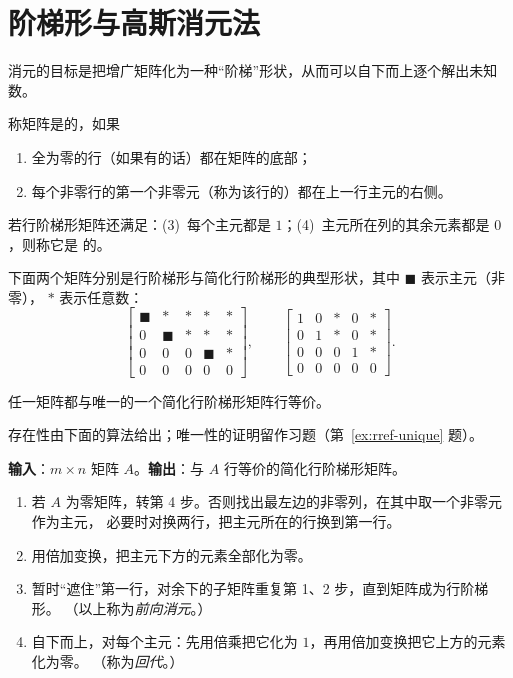 \section{阶梯形与高斯消元法}\label{sec:gauss}

消元的目标是把增广矩阵化为一种“阶梯”形状，从而可以自下而上逐个解出未知数。

\begin{definition}\label{def:echelon}
称矩阵是的，如果
\begin{enumerate}
  \item 全为零的行（如果有的话）都在矩阵的底部；
  \item 每个非零行的第一个非零元（称为该行的）都在上一行主元的右侧。
\end{enumerate}
若行阶梯形矩阵还满足：(3)~每个主元都是 $1$；(4)~主元所在列的其余元素都是 $0$，则称它是
的。
\end{definition}

下面两个矩阵分别是行阶梯形与简化行阶梯形的典型形状，其中 $\blacksquare$ 表示主元（非零），
$*$ 表示任意数：
\[
\begin{bmatrix}
\blacksquare & * & * & * & *\\
0 & \blacksquare & * & * & *\\
0 & 0 & 0 & \blacksquare & *\\
0 & 0 & 0 & 0 & 0
\end{bmatrix},
\qquad
\begin{bmatrix}
1 & 0 & * & 0 & *\\
0 & 1 & * & 0 & *\\
0 & 0 & 0 & 1 & *\\
0 & 0 & 0 & 0 & 0
\end{bmatrix}.
\]

\begin{theorem}\label{thm:rref}
任一矩阵都与唯一的一个简化行阶梯形矩阵行等价。
\end{theorem}

存在性由下面的算法给出；唯一性的证明留作习题（第~\ref{ex:rref-unique} 题）。

\begin{algorithm}[高斯--若尔当消元法]\label{alg:gauss-jordan}
\textbf{输入}：$m\times n$ 矩阵 $A$。\quad\textbf{输出}：与 $A$ 行等价的简化行阶梯形矩阵。
\begin{enumerate}[label=\arabic*., leftmargin=2em, itemsep=1pt]
  \item 若 $A$ 为零矩阵，转第 4 步。否则找出最左边的非零列，在其中取一个非零元作为主元，
        必要时对换两行，把主元所在的行换到第一行。
  \item 用倍加变换，把主元下方的元素全部化为零。
  \item 暂时“遮住”第一行，对余下的子矩阵重复第 1、2 步，直到矩阵成为行阶梯形。
        （以上称为\emph{前向消元}。）
  \item 自下而上，对每个主元：先用倍乘把它化为 $1$，再用倍加变换把它上方的元素化为零。
        （称为\emph{回代}。）
\end{enumerate}
\end{algorithm}

